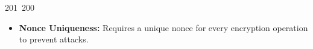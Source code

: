 201~200~\documentclass{article}
\begin{document}
\begin{itemize}
	                                                                                                                                                                                                                                                                                                	                                                                                                                                        	    	                                                                                                	                                                                                                                                                                                                                                                                                                                                	                                                                        	                                                                        	                                                                                                                                        	                                                                                                                                                                                                                        	                                                                                                                            	                                                                	                                                                                                                                                                                                \item \textbf{Nonce Uniqueness:} Requires a unique nonce for every encryption operation to prevent attacks.

\end{itemize}
\end{document}
